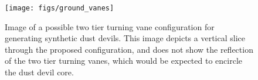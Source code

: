   \begin{figure}[!htb]
    \begin{center}
     \texttt{[image: figs/ground\_vanes]}
     \caption{Image of a possible two tier turning vane 
       configuration for generating synthetic dust devils. This image depicts a 
       vertical slice through the proposed configuration, and does not show the reflection 
       of the two tier turning vanes, which would be expected to encircle the dust devil core.}
     \label{fig:cartoon_vanes}
    \end{center}
  \end{figure}




